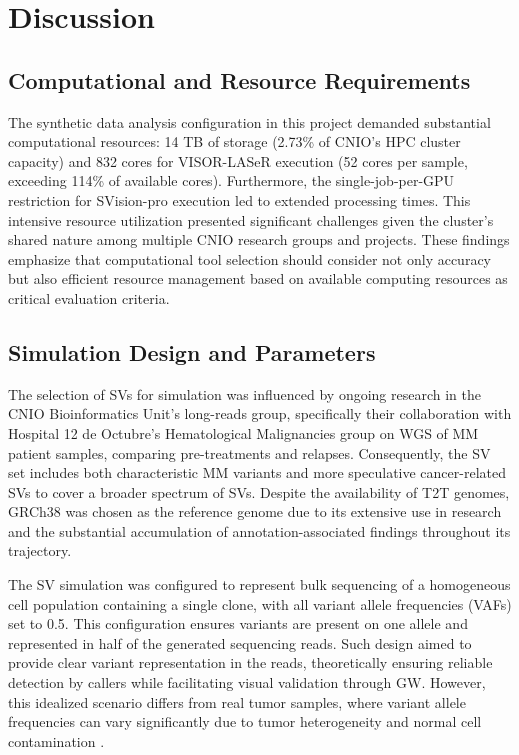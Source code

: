\chapter{Discussion}

\section{Computational and Resource Requirements}

The synthetic data analysis configuration in this project demanded substantial 
computational resources: 14 TB of storage (2.73\% of CNIO's HPC cluster 
capacity) and 832 cores for VISOR-LASeR execution (52 cores per sample, 
exceeding 114\% of available cores). Furthermore, the single-job-per-GPU 
restriction for SVision-pro execution led to extended processing times. This 
intensive resource utilization presented significant challenges given the 
cluster's shared nature among multiple CNIO research groups and projects.
These findings emphasize that computational tool selection should consider not 
only accuracy but also efficient resource management based on available 
computing resources as critical evaluation criteria.

\section{Simulation Design and Parameters}

The selection of SVs for simulation was influenced by ongoing research in the 
CNIO Bioinformatics Unit's long-reads group, specifically their collaboration 
with Hospital 12 de Octubre's Hematological Malignancies group on WGS of MM 
patient samples, comparing pre-treatments and relapses. Consequently, the SV 
set includes both characteristic MM variants and more speculative cancer-related 
SVs to cover a broader spectrum of SVs. Despite the availability of 
T2T genomes, GRCh38 was chosen as the reference genome due to its extensive use 
in research and the substantial accumulation of annotation-associated findings 
throughout its trajectory.

The SV simulation was configured to represent bulk sequencing of a homogeneous 
cell population containing a single clone, with all variant allele frequencies 
(VAFs) set to 0.5. This configuration ensures variants are present on one allele 
and represented in half of the generated sequencing reads. Such design aimed to 
provide clear variant representation in the reads, theoretically ensuring 
reliable detection by callers while facilitating visual validation through GW. 
However, this idealized scenario differs from real tumor samples, where variant 
allele frequencies can vary significantly due to tumor heterogeneity and normal 
cell contamination \cite{dagogo-jack_tumour_2018}.

